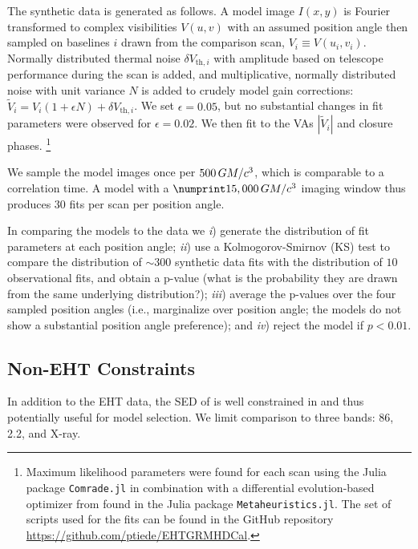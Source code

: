The synthetic data is generated as follows.
A model image $I(x,y)$ is Fourier transformed to complex visibilities $V(u,v)$ with an assumed position angle then sampled on baselines $i$ drawn from the comparison scan, $V_i \equiv V(u_i,v_i)$.
Normally distributed thermal noise $\delta V_{\mathrm{th},i}$ with amplitude based on telescope performance during the scan is added, and multiplicative, normally distributed noise with unit variance $N$ is added to crudely model gain corrections: $\tilde{V}_i = V_i (1 + \epsilon N) + \delta V_{\mathrm{th},i}$.
We set $\epsilon = 0.05$, but no substantial changes in fit parameters were observed for $\epsilon = 0.02$.
We then fit to the VAs $|\tilde{V}_i|$ and closure phases.
\footnote{
Maximum likelihood \mring parameters were found for each scan using the Julia package \texttt{Comrade.jl} \citep{comrade} in combination with a differential evolution-based optimizer from \cite{meijia} found in the Julia package \texttt{Metaheuristics.jl}.  The set of scripts used for the fits can be found in the GitHub repository \url{https://github.com/ptiede/EHTGRMHDCal}.
}

We sample the model images once per $500\,GM/c^3$, which is comparable to a correlation time.
A model with a $\no{15,000}\,\tg$ imaging window thus produces $30$ fits per scan per position angle.

In comparing the models to the data we
\emph{i}) generate the distribution of fit parameters at each position angle;
\emph{ii}) use a Kolmogorov-Smirnov (KS) test to compare the distribution of $\sim 300$ synthetic data fits with the distribution of $10$ observational fits, and obtain a p-value (what is the probability they are drawn from the same underlying distribution?);
\emph{iii}) average the p-values over the four sampled position angles (i.e., marginalize over position angle; the models do not show a substantial position angle preference); and
\emph{iv}) reject the model if $p < 0.01$.

\subsection{Non-EHT Constraints}

In addition to the EHT data, the SED of \sgra is well constrained in  and thus potentially useful for model selection.
We limit comparison to three bands: 86\GHz, 2.2\um, and X-ray.

